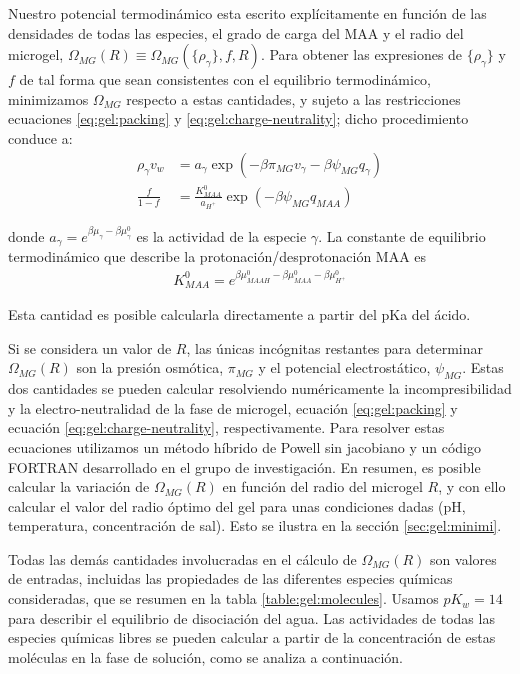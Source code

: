 Nuestro potencial termodin\'amico esta escrito expl\'icitamente en funci\'on de las densidades de todas las especies, el grado de carga del MAA y el radio del microgel, $\Omega_{MG}(R)\equiv\Omega_{MG}(\{\rho_\gamma\},f,R)$.
Para obtener las expresiones de $\{\rho_\gamma\}$ y $f$ de tal forma que sean consistentes con el equilibrio termodin\'amico, minimizamos $\Omega_{MG}$ respecto a estas cantidades, y  sujeto a las restricciones ecuaciones  \ref{eq:gel:packing} y  \ref{eq:gel:charge-neutrality}; dicho procedimiento conduce a: 
%
%
\begin{align}
\rho_\gamma v_w &= a_\gamma \exp(-\beta\pi_{MG}v_\gamma -\beta\psi_{MG}q_{\gamma})\\
\frac{f}{1-f}&= \frac{K^0_{MAA}}{a_{H^+}}\exp(-\beta\psi_{MG}q_{MAA})\label{eq:gel:fcharge}
\end{align}

\noindent donde $a_\gamma = e^{\beta\mu_\gamma-\beta\mu_\gamma^0}$ es la actividad de la especie $\gamma$. 
La constante de equilibrio termodin\'amico que describe la protonaci\'on/desprotonaci\'on MAA es
%
%
\begin{align}
K^0_{MAA}= e^{\beta\mu^0_{MAAH}-\beta\mu^0_{MAA}-\beta\mu^0_{H^+}}
\end{align}

\noindent Esta cantidad es posible calcularla directamente a partir del pKa del \'acido.


Si se considera  un valor de  $R$, las \'unicas inc\'ognitas restantes para determinar $\Omega_{MG}(R)$ son la presi\'on osm\'otica, $\pi_{MG}$ y el potencial electrost\'atico, $\psi_{MG}$.
Estas dos cantidades se pueden calcular resolviendo num\'ericamente la incompresibilidad y la electro-neutralidad de la fase de microgel, ecuaci\'on \ref{eq:gel:packing} y ecuaci\'on \ref{eq:gel:charge-neutrality}, respectivamente.
Para resolver estas ecuaciones utilizamos un m\'etodo h\'ibrido de Powell sin jacobiano y un c\'odigo FORTRAN desarrollado en el grupo de investigaci\'on.
En resumen, es posible calcular la variaci\'on de  $\Omega_{MG}(R)$ en funci\'on del radio del microgel $R$, y con ello calcular el valor del radio \'optimo del gel para unas condiciones dadas (pH, temperatura, concentraci\'on de sal). Esto se ilustra en la secci\'on \ref{sec:gel:minimi}.

Todas las dem\'as cantidades involucradas en el c\'alculo de $\Omega_{MG}(R)$ son valores de  entradas, incluidas las propiedades de las diferentes especies qu\'imicas consideradas, que se resumen en la tabla \ref{table:gel:molecules}.
Usamos $pK_w=14$ para describir el equilibrio de disociaci\'on del agua.
Las actividades de todas las especies qu\'imicas libres se pueden calcular a partir de la concentraci\'on de estas mol\'eculas en la fase de soluci\'on, como se analiza a continuaci\'on.


